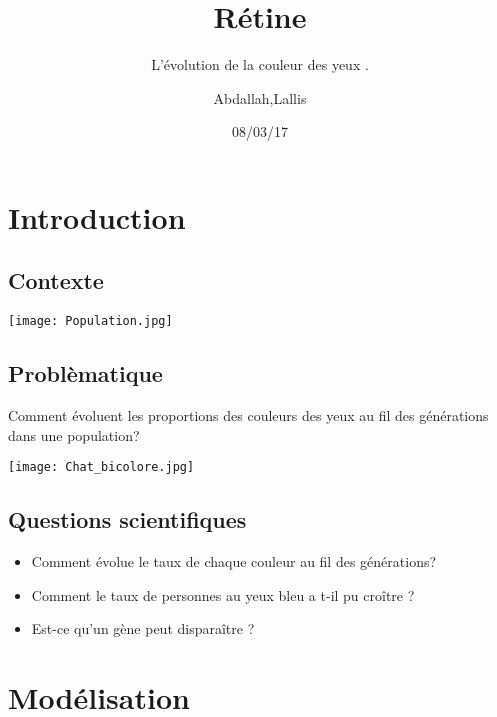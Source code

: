 \documentclass{beamer}
\title[Projet chromosome]{Rétine}
\subtitle{L'évolution de la couleur des yeux .}
\author{Abdallah,Lallis}
\date{08/03/17}
\begin{document}
\begin{frame}
\titlepage
\end{frame}

\section{Introduction}
\subsection{Contexte}

\begin{frame}
\centering
\texttt{[image: Population.jpg]} 
\end{frame}

\subsection{Problèmatique}

\begin{frame}
\begin{block}{} 
Comment évoluent les proportions des couleurs des yeux au fil des générations dans une population?
\end{block}
\centering
\texttt{[image: Chat\_bicolore.jpg]}  %
\end{frame}

\subsection{Questions scientifiques}

\begin{frame}
\begin{block}{} 
\begin{itemize}
\item Comment évolue le taux de chaque couleur au fil des générations? \newline
\item Comment le taux de personnes au yeux bleu a t-il pu croître ?  \newline
\item Est-ce qu'un gène peut disparaître ? 
\end{itemize}
\end{block}
\end{frame}

\section{Modélisation}
\end{document}
